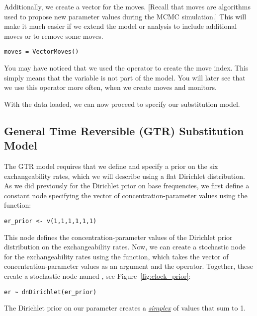 Additionally, we create a vector for the moves.
[Recall that moves are algorithms used to propose new parameter values during the MCMC simulation.]
This will make it much easier if we extend the model or analysis to include additional moves or to remove some moves.
{\tt \begin{snugshade*}
\begin{lstlisting}
moves = VectorMoves() 
\end{lstlisting}
\end{snugshade*}}
You may have noticed that we used the \cl{=} operator to create the move index.
This simply means that the variable is not part of the model.
You will later see that we use this operator more often, \EG when we create moves and monitors.

With the data loaded, we can now proceed to specify our substitution model.



\subsection{General Time Reversible (GTR) Substitution Model}

The GTR model requires that we define and specify a prior on the six exchangeability rates, which we will describe using a flat Dirichlet distribution.
As we did previously for the Dirichlet prior on base frequencies, we first define a constant node specifying the vector of concentration-parameter values using the  function:
{\tt \begin{snugshade*}
\begin{lstlisting}
er_prior <- v(1,1,1,1,1,1) 
\end{lstlisting}
\end{snugshade*}}
This node defines the concentration-parameter values of the Dirichlet prior distribution on the exchangeability rates. 
Now, we can create a stochastic node for the exchangeability rates using the  function, which takes the vector of concentration-parameter values as an argument and the \cl{\rbdn} operator. 
Together, these create a stochastic node named , see Figure~\ref{fig:clock_prior}: 
{\tt \begin{snugshade*}
\begin{lstlisting}
er ~ dnDirichlet(er_prior)
\end{lstlisting}
\end{snugshade*}}
The Dirichlet prior on our parameter  creates a \href{http://en.wikipedia.org/wiki/Simplex}{\textit{simplex}} of values that sum to 1. 


